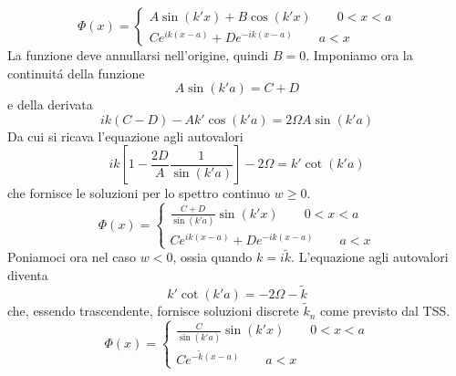 \documentclass[a4paper]{article}
\begin{document}
        \begin{equation*}
            \Phi(x)=
            \begin{cases}
                A\sin(k'x)+B\cos(k'x) \quad\quad 0<x<a\\
                Ce^{ik(x-a)}+De^{-ik(x-a)} \quad\quad a<x
            \end{cases}
        \end{equation*}
        La funzione deve annullarsi nell'origine, quindi $B=0$.
        Imponiamo ora la continuit\'a della funzione
        \begin{equation*}
            A\sin(k'a)=C+D
        \end{equation*}
        e della derivata
        \begin{equation*}
            ik(C-D)-Ak'\cos(k'a)=2\Omega A\sin(k'a)
        \end{equation*}
        Da cui si ricava l'equazione agli autovalori
        \begin{equation*}
            ik\left[1-\frac{2D}{A}\frac{1}{\sin(k'a)}\right]-2\Omega=k'\cot(k'a)
        \end{equation*}
        che fornisce le soluzioni per lo spettro continuo $w\geq 0$.
        \begin{equation*}
            \Phi(x)=
            \begin{cases}
                \frac{C+D}{\sin(k'a)}\sin(k'x) \quad\quad 0<x<a\\
                Ce^{ik(x-a)}+De^{-ik(x-a)} \quad\quad a<x
            \end{cases}
        \end{equation*}
        Poniamoci ora nel caso $w<0$, ossia quando $k=i\tilde{k}$.
        L'equazione agli autovalori diventa
        \begin{equation*}
            k'\cot(k'a)=-2\Omega-\tilde{k}
        \end{equation*}
        che, essendo trascendente, fornisce soluzioni discrete $\tilde{k}_n$ come previsto dal TSS.
        \begin{equation*}
            \Phi(x)=
            \begin{cases}
                \frac{C}{\sin(k'a)}\sin(k'x) \quad\quad 0<x<a\\
                Ce^{-\tilde{k}(x-a)} \quad\quad a<x
            \end{cases}
        \end{equation*}
\end{document}
